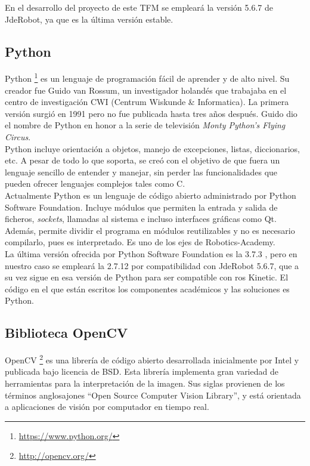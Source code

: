 En el desarrollo del proyecto de este TFM se empleará la versión 5.6.7 de JdeRobot, ya que es la última versión estable.


\subsection{Python}

Python \footnote{\url{https://www.python.org/}} es un lenguaje de programación fácil de aprender y de alto nivel. Su creador fue Guido van Rossum, un investigador holandés que trabajaba en el centro de investigación CWI (Centrum Wiskunde \& Informatica). La primera versión surgió en 1991 pero no fue publicada hasta tres años después. Guido dio el nombre de Python en honor a la serie de televisión \textit{Monty Python’s Flying Circus}.\\

Python incluye orientación a objetos, manejo de excepciones, listas, diccionarios, etc. A pesar de todo lo que soporta, se creó con el objetivo de que fuera un lenguaje sencillo de entender y manejar, sin perder las funcionalidades que pueden ofrecer lenguajes complejos tales como C.\\

Actualmente Python es un lenguaje de código abierto administrado por Python Software Foundation. Incluye módulos que permiten la entrada y salida de ficheros, \textit{sockets}, llamadas al sistema e incluso interfaces gráficas como Qt. Además, permite dividir el programa en módulos reutilizables y no es necesario compilarlo, pues es interpretado. Es uno de los ejes de Robotics-Academy.\\

La última versión ofrecida por Python Software Foundation es la 3.7.3 , pero en nuestro caso se empleará la 2.7.12 por compatibilidad con JdeRobot 5.6.7, que a su vez sigue en esa versión de Python para ser compatible con \acrshort{ros} Kinetic. El código en el que están escritos los componentes académicos y las soluciones es Python.


\subsection{Biblioteca OpenCV}

OpenCV \footnote{\url{http://opencv.org/}} es una librería de código abierto desarrollada inicialmente por Intel y publicada bajo licencia de BSD. Esta librería implementa gran variedad de herramientas para la interpretación de la imagen. Sus siglas provienen de los términos anglosajones ``Open Source Computer Vision Library'', y está orientada a aplicaciones de visión por computador en tiempo real. \\

